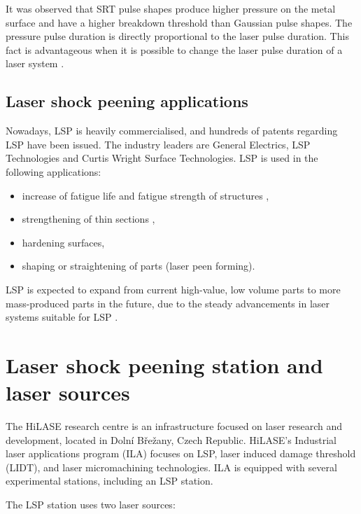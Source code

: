 It was observed that SRT pulse shapes produce higher pressure on the metal surface and have a higher breakdown threshold than Gaussian pulse shapes. The pressure pulse duration is directly proportional to the laser pulse duration.  This fact is advantageous when it is possible to change the laser pulse duration of a laser system \cite{devaux_fabbro_tollier_bartnicki_1993}. 


\subsection{Laser shock peening applications}

Nowadays, LSP is heavily commercialised, and hundreds of patents regarding LSP have been issued. The industry leaders are General Electrics, LSP Technologies and Curtis Wright Surface Technologies. LSP is used in the following applications:

\begin{itemize}
 
    \item increase of fatigue life and fatigue strength of structures \cite{dane_hackel_daly_harrisson_2000},
    \item strengthening of thin sections \cite{vaccari_1992},
    \item hardening surfaces,
    \item shaping or straightening of parts  (laser peen forming).

\end{itemize}

LSP is expected to expand from current high-value, low volume parts to more mass-produced parts in the future, due to the steady advancements in laser systems suitable for LSP \cite{clauer_2019}. 



\section{Laser shock peening station and laser sources}

The HiLASE research centre is an infrastructure focused on laser research and development, located in Dolní Břežany, Czech Republic. HiLASE's Industrial laser applications program (ILA) focuses on LSP, laser induced damage threshold (LIDT), and laser micromachining technologies. ILA is equipped with several experimental stations, including an LSP station. 

The LSP station uses two laser sources:

